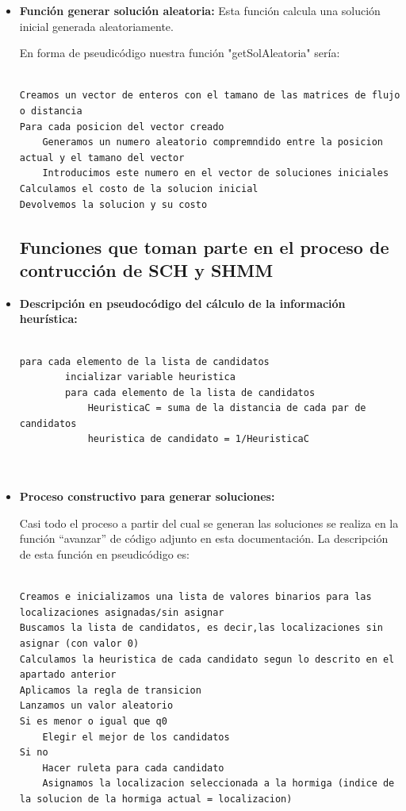 \begin{itemize}
\begin{lstlisting}[language=SH]
	\end{lstlisting}
	\newpage
		\item \textbf{Función generar solución aleatoria:}	
		Esta función calcula una solución inicial generada aleatoriamente.
		
		En forma de pseudicódigo nuestra función "getSolAleatoria" sería:
		
		\begin{lstlisting}[language=SH]
		
Creamos un vector de enteros con el tamano de las matrices de flujo o distancia
Para cada posicion del vector creado
	Generamos un numero aleatorio compremndido entre la posicion actual y el tamano del vector
	Introducimos este numero en el vector de soluciones iniciales
Calculamos el costo de la solucion inicial
Devolvemos la solucion y su costo
		\end{lstlisting}
		
		\subsection{Funciones que toman parte en el proceso de contrucción de SCH y SHMM}
			\item \textbf{Descripción en pseudocódigo del cálculo de la información heurística:}
	
	\begin{lstlisting}[language=SH]
	
para cada elemento de la lista de candidatos
        incializar variable heuristica
        para cada elemento de la lista de candidatos
            HeuristicaC = suma de la distancia de cada par de candidatos
            heuristica de candidato = 1/HeuristicaC
        
	
	\end{lstlisting}
\newpage		
		\item \textbf{Proceso constructivo para generar soluciones:}
		
		Casi todo el proceso a partir del cual se generan las soluciones se realiza en la función ``avanzar'' de código adjunto en esta documentación. La descripción de esta función en pseudicódigo es:
		
		\begin{lstlisting}[language=SH]
		
Creamos e inicializamos una lista de valores binarios para las localizaciones asignadas/sin asignar
Buscamos la lista de candidatos, es decir,las localizaciones sin asignar (con valor 0)
Calculamos la heuristica de cada candidato segun lo descrito en el apartado anterior
Aplicamos la regla de transicion
Lanzamos un valor aleatorio
Si es menor o igual que q0
	Elegir el mejor de los candidatos
Si no
	Hacer ruleta para cada candidato
	Asignamos la localizacion seleccionada a la hormiga (indice de la solucion de la hormiga actual = localizacion)
		\end{lstlisting}

\end{itemize} 

